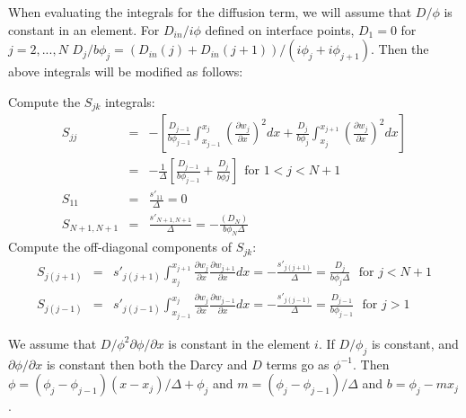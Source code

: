 When evaluating the integrals for the diffusion term, we will assume
that $D/\phi$ is constant in an element.  For $D_{in}/i\phi$ defined on interface
points, $D_1 = 0$  
for $j = 2,...,N$
$D_j/b\phi_j = (D_{in}(j) + D_{in}(j+1))/(i\phi_j + i\phi_{j+1})$.  Then the above integrals will
be modified as follows:

Compute the $S_{jk}$ integrals:
\begin{eqnarray}
S_{jj} & = & - \left[\frac{D_{j-1}}{b\phi_{j-1}} \int_{x_{j-1}}^{x_j}\left( \frac{\partial
      w_j}{\partial x}\right)^2 dx + \frac{D_{j}}{b\phi_{j}} \int_{x_{j}}^{x_{j+1}}
  \left(\frac{\partial w_j}{\partial x}\right)^2 dx \right] \nonumber
\\
& = & -\frac{1}{\Delta}\left[\frac{D_{j-1}}{b\phi_{j-1}} + \frac{D_{j}}{b\phi{j}}\right]\ \ \mbox{for }1 < j < N+1 \nonumber \\
S_{11} & = & \frac{s'_{11}}{\Delta}  = 0 \nonumber \\
S_{N+1,N+1} & = & \frac{s'_{N+1,N+1}}{\Delta} = -\frac{(D_{N})}{b\phi_{N}\Delta}
\end{eqnarray}
Compute the off-diagonal components of $S_{jk}$:
\begin{eqnarray}
S_{j(j+1)} & = & s'_{j(j+1)}\int_{x_j}^{x_{j+1}}\frac{\partial
  w_j}{\partial x} \frac{\partial w_{j+1}}{\partial x} dx =
-\frac{s'_{j(j+1)}}{\Delta} =
\frac{D_{j}}{b\phi_{j}\Delta} \ \ \ \mbox{for } j < N+1
\nonumber \\
S_{j(j-1)} & = & s'_{j(j-1)}\int_{x_{j-1}}^{x_{j}}\frac{\partial
  w_j}{\partial x} \frac{\partial w_{j-1}}{\partial x} dx =
-\frac{s'_{j(j-1)}}{\Delta} =
\frac{D_{j-1}}{b\phi_{j-1}} \ \ \ \mbox{for } j > 1
\end{eqnarray}


We assume that $D/\phi^2 \partial \phi/\partial x$
is constant in the element $i$.  If $D/\phi_j$ is
constant, and $\partial \phi/\partial x$ is constant then both the
Darcy and $D$ terms go as $\phi^{-1}$.  Then  $\phi = (\phi_j -
\phi_{j-1})(x-x_j)/\Delta + \phi_j$  and $m = (\phi_j -
\phi_{j-1})/\Delta$ and $b = \phi_j - mx_j$.

